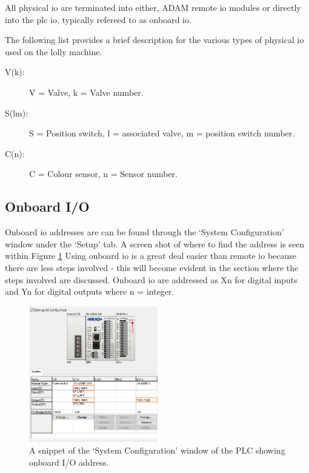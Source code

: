     All physical \acrshort{io} are terminated into either,  ADAM remote \acrshort{io} modules or directly into the \acrshort{plc} \acrshort{io}, typically refereed to as onboard \acrshort{io}.

    The following list provides a brief description for the various types of physical \acrshort{io} used on the lolly machine. 

    \begin{description}
        \item[V(k):] V = Valve, k = Valve number.
        \item[S(lm):] S = Position switch, l = associated valve, m = position switch number.
        \item[C(n):] C = Colour sensor, n = Sensor number.
    \end{description}



    \subsection{Onboard I/O}
        Onboard \acrshort{io} addresses are can be found through the `System Configuration' window under the `Setup' tab. A screen shot of where to find the address is seen within Figure \ref{fig:plcConfig}
        Using onboard \acrshort{io} is a great deal easier than remote \acrshort{io} because there are less steps involved - this will become evident in the section where the steps involved are discussed. Onboard \acrshort{io} are addressed as Xn for digital inputs and Yn for digital outputs where n = integer. 
        
        \begin{figure}[H]
            \centering
            \includegraphics[width = 0.5\textwidth]{2_images/plcConfig.png}
            \caption{A snippet of the `System Configuration' window of the PLC showing onboard I/O address.}
            \label{fig:plcConfig}
        \end{figure}
        
